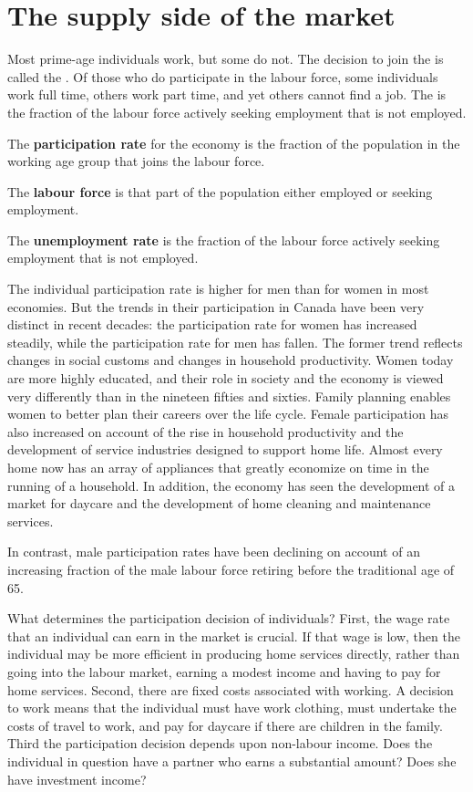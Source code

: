 \section{The supply side of the market}\label{sec:ch12sec3}

Most prime-age individuals work, but some do not. The decision to join the  is called the . Of those who do participate in the labour force, some individuals work full time, others work part time, and yet others cannot find a job. The  is the fraction of the labour force actively seeking employment that is not employed.

\begin{DefBox}
The \textbf{participation rate} for the economy is the fraction of the population in the working age group that joins the labour force.

The \textbf{labour force} is that part of the population either employed or seeking employment.

The \textbf{unemployment rate} is the fraction of the labour force actively seeking employment that is not employed.
\end{DefBox}

The individual participation rate is higher for men than for women in most economies. But the trends in their participation in Canada have been very distinct in recent decades: the participation rate for women has increased steadily, while the participation rate for men has fallen. The former trend reflects changes in social customs and changes in household productivity. Women today are more highly educated, and their role in society and the economy is viewed very differently than in the nineteen fifties and sixties. Family planning enables women to better plan their careers over the life cycle. Female participation has also increased on account of the rise in household productivity and the development of service industries designed to support home life. Almost every home now has an array of appliances that greatly economize on time in the running of a household.  In addition, the economy has seen the development of a market for daycare and the development of home cleaning and maintenance services.  

In contrast, male participation rates have been declining on account of an increasing fraction of the male labour force retiring before the traditional age of 65.

What determines the participation decision of individuals? First, the wage rate that an individual can earn in the market is crucial. If that wage is low, then the individual may be more efficient in producing home services directly, rather than going into the labour market, earning a modest income and having to pay for home services.  Second, there are fixed costs associated with working. A decision to work means that the individual must have work clothing, must undertake the costs of travel to work, and pay for daycare if there are children in the family.  Third the participation decision depends upon non-labour income. Does the individual in question have a partner who earns a substantial amount? Does she have investment income?

